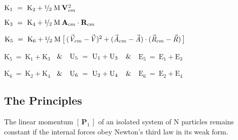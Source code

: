\documentclass[10pt]{article}
\newcommand{\med}{\raise.5ex\hbox{$\scriptstyle 1$}\kern-.15em/\kern-.09em\lower.25ex\hbox{$\scriptstyle 2$}}
\begin{document}
\par \noindent ${\mathrm{K}}_1 ~=~ {\mathrm{K}}_2 + \med \; {\mathrm{M}} \: {\mathbf{V}}_{cm}^{\hspace{+0.045em}2}$
\vspace{+0.99em}
\par \noindent ${\mathrm{K}}_3 ~=~ {\mathrm{K}}_4 + \med \; {\mathrm{M}} \: {\mathbf{A}}_{cm} \cdot {\mathbf{R}}_{cm}$
\vspace{+0.99em}
\par \noindent ${\mathrm{K}}_5 ~=~ {\mathrm{K}}_6 + \med \; {\mathrm{M}} \: \big [ \, ({\vec{\mathit{V}}}_{cm} - \hspace{-0.120em}{\vec{\mathit{V}}})^2 + ({\vec{\mathit{A}}}_{cm} - {\vec{\mathit{A}}}) \cdot ({\vec{\mathit{R}}}_{cm} - {\vec{\mathit{R}}}) \, \big ]$
\vspace{+0.99em}
\par \noindent ${\mathrm{K}}_5 ~=~ {\mathrm{K}}_1 + {\mathrm{K}}_3$ $\hspace{+0.540em} \& \hspace{+0.540em}$ ${\mathrm{U}}_5 ~=~ {\mathrm{U}}_1 \hspace{+0.027em}+\hspace{+0.027em} {\mathrm{U}}_3$ $\hspace{+0.630em} \& \hspace{+0.630em}$ ${\mathrm{E}}_5 ~=~ {\mathrm{E}}_1 + {\mathrm{E}}_3$
\vspace{+0.99em}
\par \noindent ${\mathrm{K}}_6 ~=~ {\mathrm{K}}_2 + {\mathrm{K}}_4$ $\hspace{+0.540em} \& \hspace{+0.540em}$ ${\mathrm{U}}_6 ~=~ {\mathrm{U}}_2 \hspace{+0.027em}+\hspace{+0.027em} {\mathrm{U}}_4$ $\hspace{+0.630em} \& \hspace{+0.630em}$ ${\mathrm{E}}_6 ~=~ {\mathrm{E}}_2 + {\mathrm{E}}_4$

\newpage

\par {\centering\subsection*{The Principles}}

\par \bigskip\smallskip \noindent The linear momentum $[ \, {\mathbf{P}}_1 \, ]$ of an isolated system of N particles remains constant if the internal forces obey Newton's third law in its weak form.
\end{document}
